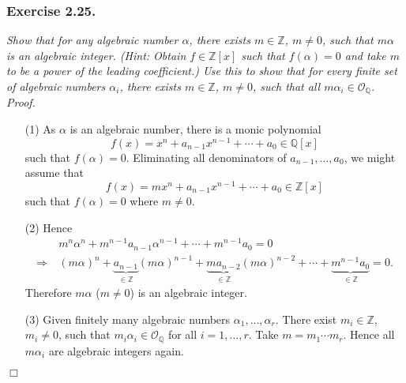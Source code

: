 \documentclass{article}
\begin{document}



\subsubsection*{Exercise 2.25.}
\emph{Show that for any algebraic number $\alpha$,
there exists $m \in \mathbb{Z}$, $m \neq 0$, such that $m\alpha$ is an algebraic integer.
(Hint: Obtain $f \in \mathbb{Z}[x]$ such that $f(\alpha) = 0$ and
take $m$ to be a power of the leading coefficient.)
Use this to show that for every finite set of algebraic numbers $\alpha_i$,
there exists $m \in \mathbb{Z}$, $m \neq 0$,
such that all $m\alpha_i \in \mathcal{O}_{\mathbb{Q}}$.} \\



\emph{Proof.}
\begin{enumerate}
\item[(1)]
  As $\alpha$ is an algebraic number,
  there is a monic polynomial
  \[
    f(x) = x^n + a_{n-1} x^{n-1} + \cdots + a_0 \in \mathbb{Q}[x]
  \]
  such that $f(\alpha) = 0$.
  Eliminating all denominators of $a_{n-1}, \ldots, a_0$, we might assume that
  \[
    f(x) = m x^n + a_{n-1} x^{n-1} + \cdots + a_0 \in \mathbb{Z}[x]
  \]
  such that $f(\alpha) = 0$ where $m \neq 0$.

\item[(2)]
  Hence
  \begin{align*}
    & \:
    m^n \alpha^n + m^{n-1} a_{n-1} \alpha^{n-1} + \cdots + m^{n-1} a_0 = 0 \\
    \Longrightarrow & \:
    (m\alpha)^n + \underbrace{a_{n-1}}_{\in \mathbb{Z}} (m\alpha)^{n-1}
        + \underbrace{m a_{n-2}}_{\in \mathbb{Z}} (m\alpha)^{n-2} + \cdots
        + \underbrace{m^{n-1} a_0}_{\in \mathbb{Z}} = 0.
  \end{align*}
  Therefore $m\alpha$ ($m \neq 0$) is an algebraic integer.

\item[(3)]
  Given finitely many algebraic numbers $\alpha_1, \ldots, \alpha_r$.
  There exist $m_i \in \mathbb{Z}$, $m_i \neq 0$, such that $m_i \alpha_i \in \mathcal{O}_{\mathbb{Q}}$
  for all $i = 1, \ldots, r$.
  Take $m = m_1 \cdots m_r$.
  Hence all $m\alpha_i$ are algebraic integers again.
\end{enumerate}
$\Box$ \\\\
\end{document}
